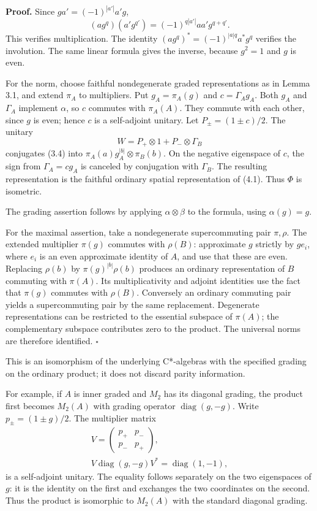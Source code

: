 \documentclass[
  11pt,
]{article}
\begin{document}
\textbf{Proof.} Since \(ga'=(-1)^{|a'|}a'g\), \[
(ag^q)(a'g^{q'})
=(-1)^{q|a'|}aa'g^{q+q'}.
\] This verifies multiplication. The identity
\((ag^q)^*=(-1)^{|a|q}a^*g^q\) verifies the involution. The same linear
formula gives the inverse, because \(g^2=1\) and \(g\) is even.

For the norm, choose faithful nondegenerate graded representations as in
Lemma 3.1, and extend \(\pi_A\) to multipliers. Put \(g_A=\pi_A(g)\) and
\(c=\Gamma_Ag_A\). Both \(g_A\) and \(\Gamma_A\) implement \(\alpha\),
so \(c\) commutes with \(\pi_A(A)\). They commute with each other, since
\(g\) is even; hence \(c\) is a self-adjoint unitary. Let
\(P_\pm=(1\pm c)/2\). The unitary \[
W=P_+\otimes1+P_-\otimes\Gamma_B
\] conjugates (3.4) into \(\pi_A(a)g_A^{|b|}\otimes\pi_B(b)\). On the
negative eigenspace of \(c\), the sign from \(\Gamma_A=cg_A\) is
canceled by conjugation with \(\Gamma_B\). The resulting representation
is the faithful ordinary spatial representation of (4.1). Thus \(\Phi\)
is isometric.

The grading assertion follows by applying \(\alpha\otimes\beta\) to the
formula, using \(\alpha(g)=g\).

For the maximal assertion, take a nondegenerate supercommuting pair
\(\pi,\rho\). The extended multiplier \(\pi(g)\) commutes with
\(\rho(B)\): approximate \(g\) strictly by \(ge_i\), where \(e_i\) is an
even approximate identity of \(A\), and use that these are even.
Replacing \(\rho(b)\) by \(\pi(g)^{|b|}\rho(b)\) produces an ordinary
representation of \(B\) commuting with \(\pi(A)\). Its multiplicativity
and adjoint identities use the fact that \(\pi(g)\) commutes with
\(\rho(B)\). Conversely an ordinary commuting pair yields a
supercommuting pair by the same replacement. Degenerate representations
can be restricted to the essential subspace of \(\pi(A)\); the
complementary subspace contributes zero to the product. The universal
norms are therefore identified. \(\square\)

This is an isomorphism of the underlying C*-algebras with the specified
grading on the ordinary product; it does not discard parity information.

For example, if \(A\) is inner graded and \(M_2\) has its diagonal
grading, the product first becomes \(M_2(A)\) with grading operator
\(\operatorname{diag}(g,-g)\). Write \(p_\pm=(1\pm g)/2\). The
multiplier matrix \[
\begin{gathered}
V=\begin{pmatrix}p_+&p_-\\p_-&p_+\end{pmatrix},
\\
V\operatorname{diag}(g,-g)V^*=\operatorname{diag}(1,-1),
\end{gathered}
\tag{4.2}
\] is a self-adjoint unitary. The equality follows separately on the two
eigenspaces of \(g\): it is the identity on the first and exchanges the
two coordinates on the second. Thus the product is isomorphic to
\(M_2(A)\) with the standard diagonal grading.
\end{document}
